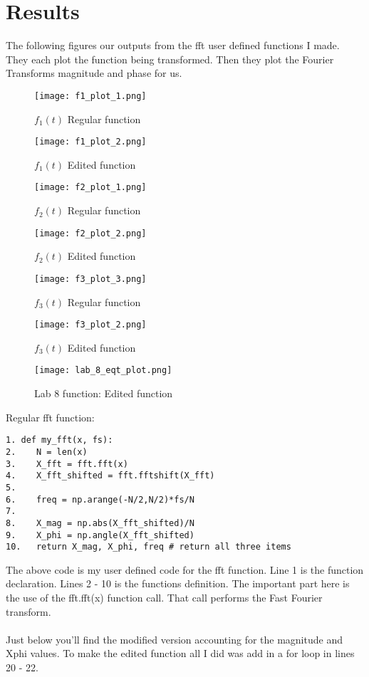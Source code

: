 \documentclass[12pt]{article}
\begin{document}
\section{Results}

The following figures our outputs from the fft user defined functions I made. They each plot the function being transformed. Then they plot the Fourier Transforms magnitude and phase for us.

\begin{figure}[H]
\caption{$f_1(t)$ Regular function}
\centering
\texttt{[image: f1\_plot\_1.png]}
\end{figure}

\begin{figure}[H]
\caption{$f_1(t)$ Edited function}
\centering
\texttt{[image: f1\_plot\_2.png]}
\end{figure}

\begin{figure}[H]
\caption{$f_2(t)$ Regular function}
\centering
\texttt{[image: f2\_plot\_1.png]}
\end{figure}

\begin{figure}[H]
\caption{$f_2(t)$ Edited function}
\centering
\texttt{[image: f2\_plot\_2.png]}
\end{figure}

\begin{figure}[H]
\caption{$f_3(t)$ Regular function}
\centering
\texttt{[image: f3\_plot\_3.png]}
\end{figure}

\begin{figure}[H]
\caption{$f_3(t)$ Edited function}
\centering
\texttt{[image: f3\_plot\_2.png]}
\end{figure}

\begin{figure}[H]
\caption{Lab 8 function: Edited function}
\centering
\texttt{[image: lab\_8\_eqt\_plot.png]}
\end{figure}


Regular fft function:
\begin{lstlisting}
1. def my_fft(x, fs):
2.    N = len(x)
3.    X_fft = fft.fft(x)
4.    X_fft_shifted = fft.fftshift(X_fft)
5.    
6.    freq = np.arange(-N/2,N/2)*fs/N
7.    
8.    X_mag = np.abs(X_fft_shifted)/N
9.    X_phi = np.angle(X_fft_shifted)
10.   return X_mag, X_phi, freq # return all three items
\end{lstlisting}
The above code is my user defined code for the fft function. Line 1 is the function declaration. Lines 2 - 10 is the functions definition. The important part here is the use of the fft.fft(x) function call. That call performs the Fast Fourier transform.
\\
\\
Just below you'll find the modified version accounting for the magnitude and X\textunderscore phi values. To make the edited function all I did was add in a for loop in lines 20 - 22.
\end{document}
